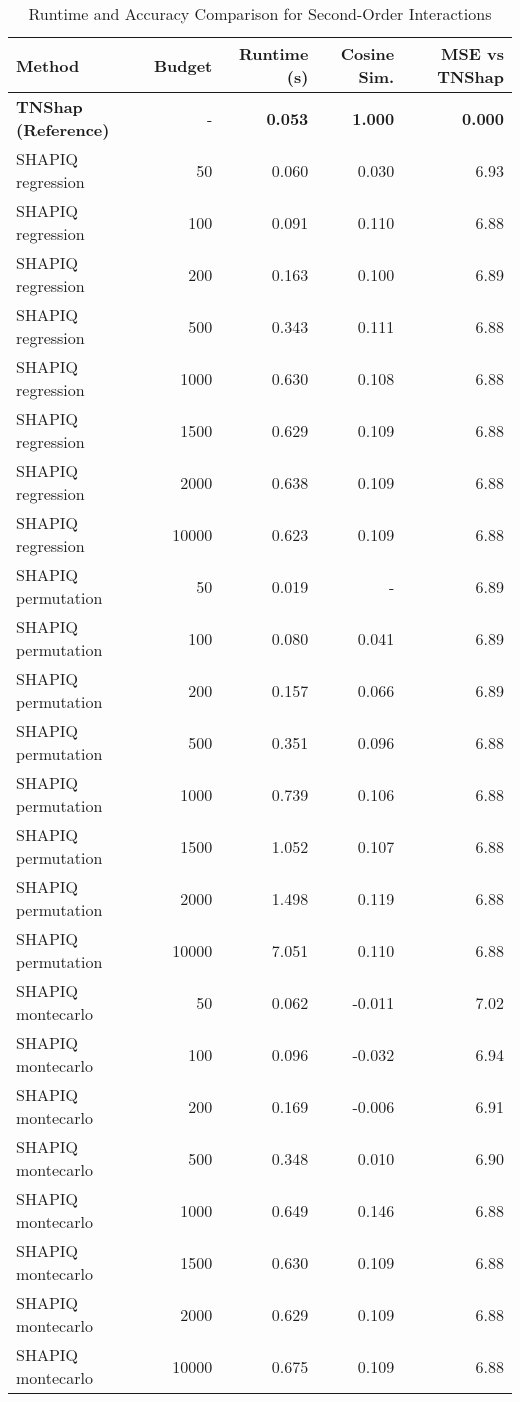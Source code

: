 \documentclass{article}
\begin{document}
\begin{table}[h!]
\centering
\caption{Runtime and Accuracy Comparison for Second-Order Interactions}
\label{tab:order2}
\small
\begin{tabular}{lrrrr}
\toprule
\textbf{Method} & \textbf{Budget} & \textbf{Runtime (s)} & \textbf{Cosine Sim.} & \textbf{MSE vs TNShap} \\
\midrule
\rowcolor{green!10}
\textbf{TNShap (Reference)} & - & \textbf{0.053} & \textbf{1.000} & \textbf{0.000} \\
\midrule
SHAPIQ regression & 50 & 0.060 & 0.030 & 6.93 \\
SHAPIQ regression & 100 & 0.091 & 0.110 & 6.88 \\
SHAPIQ regression & 200 & 0.163 & 0.100 & 6.89 \\
SHAPIQ regression & 500 & 0.343 & 0.111 & 6.88 \\
SHAPIQ regression & 1000 & 0.630 & 0.108 & 6.88 \\
SHAPIQ regression & 1500 & 0.629 & 0.109 & 6.88 \\
SHAPIQ regression & 2000 & 0.638 & 0.109 & 6.88 \\
SHAPIQ regression & 10000 & 0.623 & 0.109 & 6.88 \\
\midrule
SHAPIQ permutation & 50 & 0.019 & - & 6.89 \\
SHAPIQ permutation & 100 & 0.080 & 0.041 & 6.89 \\
SHAPIQ permutation & 200 & 0.157 & 0.066 & 6.89 \\
SHAPIQ permutation & 500 & 0.351 & 0.096 & 6.88 \\
SHAPIQ permutation & 1000 & 0.739 & 0.106 & 6.88 \\
SHAPIQ permutation & 1500 & 1.052 & 0.107 & 6.88 \\
SHAPIQ permutation & 2000 & 1.498 & 0.119 & 6.88 \\
SHAPIQ permutation & 10000 & 7.051 & 0.110 & 6.88 \\
\midrule
SHAPIQ montecarlo & 50 & 0.062 & -0.011 & 7.02 \\
SHAPIQ montecarlo & 100 & 0.096 & -0.032 & 6.94 \\
SHAPIQ montecarlo & 200 & 0.169 & -0.006 & 6.91 \\
SHAPIQ montecarlo & 500 & 0.348 & 0.010 & 6.90 \\
SHAPIQ montecarlo & 1000 & 0.649 & 0.146 & 6.88 \\
SHAPIQ montecarlo & 1500 & 0.630 & 0.109 & 6.88 \\
SHAPIQ montecarlo & 2000 & 0.629 & 0.109 & 6.88 \\
SHAPIQ montecarlo & 10000 & 0.675 & 0.109 & 6.88 \\
\bottomrule
\end{tabular}
\end{table}
\end{document}
